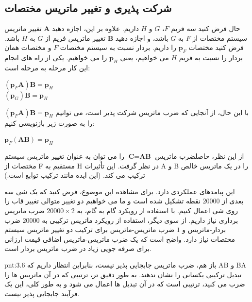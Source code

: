 \subsection{\textbf{شرکت پذیری و تغییر ماتریس مختصات}}
\label{subsec:3.4.4}
{
    \Large
    \begin{spacing}{1.5}
        حال فرض کنید سه فریم $F$، $G$ و $H$ داریم. علاوه بر این، اجازه دهید $\textbf{A}$
        تغییر ماتریس سیستم مختصات از $F$ به $G$ باشد،
        و اجازه دهید $\textbf{B}$ تغییر ماتریس فریم از $G$ به $H$ باشد. فرض کنید مختصات $\textbf{p}_{F}$ را داریم.
        بردار نسبت به سیستم مختصات $F$ و مختصات همان بردار را نسبت به فریم $H$ می خواهیم، ​​یعنی $\textbf{p}_{H}$ را می خواهیم.
        یکی از راه های انجام این کار مرحله به مرحله است:

        \begin{center}
            $(\textbf{p}_{F}\textbf{A})\textbf{B}=\textbf{p}_{H}$ \\
            $(\textbf{p}_{G})\textbf{B}=\textbf{p}_{H}$
        \end{center}

        با این حال، از آنجایی که ضرب ماتریس شرکت پذیر است، می توانیم $(\textbf{p}_{F}\textbf{A})\textbf{B}=\textbf{p}_{H}$ را به صورت زیر بازنویسی کنیم:

        \begin{center}
            $\textbf{p}_{F}(\textbf{A}\textbf{B})=\textbf{p}_{H}$
        \end{center}

        از این نظر، حاصلضرب ماتریس $\textbf{C}=\textbf{AB}$ را می توان به عنوان تغییر ماتریس سیستم مختصات از F مستقیم به H در نظر گرفت.
        این تأثیرات A و B را در یک ماتریس خالص ترکیب می کند. (این ایده مانند ترکیب توابع است.)

        این پیامدهای عملکردی دارد. برای مشاهده این موضوع، فرض کنید که یک شی سه بعدی از $20000$ نقطه تشکیل شده است و ما می خواهیم دو تغییر متوالی تغییر قاب را روی شی اعمال کنیم.
        با استفاده از رویکرد گام به گام، به $20000\times 2$ ضرب ماتریس برداری نیاز داریم. از سوی دیگر، استفاده از رویکرد ماتریس ترکیبی به $20000$ ضرب بردار-ماتریس و $1$ ضرب ماتریس-ماتریس برای ترکیب دو تغییر ماتریس سیستم مختصات نیاز دارد.
        واضح است که یک ضرب ماتریس-ماتریس اضافی قیمت ارزانی برای صرفه جویی زیاد در ضرب ماتریس بردار است.

        \begin{point}{pnt:3.6}
            \Large
            باز هم، ضرب ماتریس جابجایی پذیر نیست، بنابراین انتظار داریم که AB و BA تبدیل ترکیبی یکسانی را نشان ندهند.
            به طور دقیق تر، ترتیبی که در آن ماتریس ها را ضرب می کنید، ترتیبی است که در آن تبدیل ها اعمال می شود و به طور کلی، این یک فرآیند جابجایی پذیر نیست.
        \end{point}
    \end{spacing}
}

